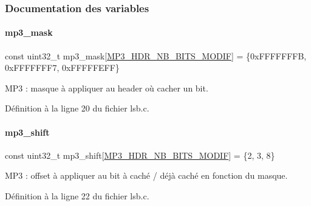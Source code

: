 \subsubsection{Documentation des variables}
\mbox{\label{a00032_ae3d02d9170a4bf482089f3d6f5606458}} 
\paragraph{\texorpdfstring{mp3\+\_\+mask}{mp3\_mask}}
{\footnotesize\ttfamily const uint32\+\_\+t mp3\+\_\+mask\mbox{[}\hyperlink{a00089_a8922ae84b90bc792376936798a647326}{M\+P3\+\_\+\+H\+D\+R\+\_\+\+N\+B\+\_\+\+B\+I\+T\+S\+\_\+\+M\+O\+D\+IF}\mbox{]} = \{0x\+F\+F\+F\+F\+F\+F\+F\+B, 0x\+F\+F\+F\+F\+F\+F\+F7, 0x\+F\+F\+F\+F\+F\+E\+F\+F\}\hspace{0.3cm}{\ttfamily [static]}}

M\+P3 \+: masque à appliquer au header où cacher un bit. 

Définition à la ligne 20 du fichier lsb.\+c.

\mbox{\label{a00032_acd9a62842d3772d036c5ed36acbcc963}} 
\paragraph{\texorpdfstring{mp3\+\_\+shift}{mp3\_shift}}
{\footnotesize\ttfamily const uint32\+\_\+t mp3\+\_\+shift\mbox{[}\hyperlink{a00089_a8922ae84b90bc792376936798a647326}{M\+P3\+\_\+\+H\+D\+R\+\_\+\+N\+B\+\_\+\+B\+I\+T\+S\+\_\+\+M\+O\+D\+IF}\mbox{]} = \{2, 3, 8\}\hspace{0.3cm}{\ttfamily [static]}}

M\+P3 \+: offset à appliquer au bit à caché / déjà caché en fonction du masque. 

Définition à la ligne 22 du fichier lsb.\+c.

